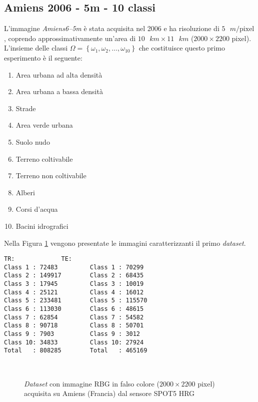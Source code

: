 \subsection{Amiens 2006 - 5m - 10 classi}
L'immagine \emph{Amiens6--5m} è stata acquisita nel 2006 e ha risoluzione di $5\text{ }m/\text{pixel}$, coprendo approssimativamente un'area di $10\text{ }km\times11\text{ }km$ ($2000\times2200$ pixel).\\
L'insieme delle classi $\Omega=\left\lbrace\omega_1,\omega_2,\ldots,\omega_{10}\right\rbrace$ che costituisce questo primo esperimento è il seguente:
\begin{enumerate}
\item Area urbana ad alta densità
\item Area urbana a bassa densità
\item Strade
\item Area verde urbana 
\item Suolo nudo
\item Terreno coltivabile
\item Terreno non coltivabile 
\item Alberi
\item Corsi d'acqua
\item Bacini idrografici
\end{enumerate}
Nella Figura \ref{fig: Amiens65m} vengono presentate le immagini caratterizzanti il primo \emph{dataset}. 
\begin{lstlisting}[float=b,title={Distribuzione dei pixel di training e test classe per classe.},
                   label=lst:esempio, frame=lines]
TR:				TE:
Class 1 : 72483 		Class 1 : 70299
Class 2 : 149917 		Class 2 : 68435
Class 3 : 17945 		Class 3 : 10019
Class 4 : 25121 		Class 4 : 16012
Class 5 : 233481 		Class 5 : 115570
Class 6 : 113030 		Class 6 : 48615
Class 7 : 62854 		Class 7 : 54582
Class 8 : 90718 		Class 8 : 50701
Class 9 : 7903 			Class 9 : 3012
Class 10: 34833 		Class 10: 27924
Total   : 808285		Total   : 465169
\end{lstlisting}
\clearpage
\begin{figure}[!ht]
   \center
   \\%
     \hspace{4mm}
    \caption{\emph{Dataset} con immagine RBG in falso colore ($2000\times2200$ pixel) acquisita su Amiens (Francia) dal sensore \textsc{SPOT5 HRG}}
    \label{fig: Amiens65m}
  \end{figure}
  
